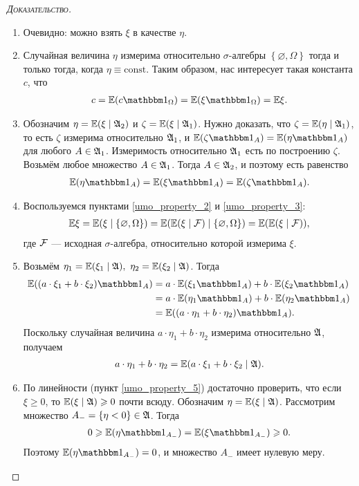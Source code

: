 \documentclass[../main.tex]{subfiles}
\begin{document}
 \begin{proof}[\normalfont\textsc{Доказательство}]\
  \begin{enumerate}
   \item Очевидно: можно взять $ \xi $ в качестве $ \eta $.
   \item Случайная величина $ \eta $ измерима относительно $ \sigma $-алгебры $ \left\{ \varnothing, \Omega \right\} $ тогда и только тогда, когда $ \eta \equiv \mathrm{const} $. Таким образом, нас интересует такая константа $ c $, что
    \begin{align*}
     c = \E(c \Ind_\Omega) = \E(\xi \Ind_\Omega) = \E\xi.
    \end{align*}
   \item Обозначим $ \eta = \mathbb E(\xi \mid \mathfrak A_2) $ и $ \zeta = \mathbb E(\xi \mid \mathfrak A_1) $. Нужно доказать, что $ \zeta = \mathbb E(\eta \mid \mathfrak A_1) $, то есть $ \zeta $ измерима относительно $ \mathfrak A_1 $, и $ \E(\zeta\Ind_A) = \E(\eta\Ind_A) $ для любого $ A \in \mathfrak A_1 $. Измеримость относительно $ \mathfrak A_1 $ есть по построению $ \zeta $. Возьмём любое множество $ A \in \mathfrak A_1 $. Тогда $ A \in \mathfrak A_2 $, и поэтому есть равенство
    \begin{align*}
     \E(\eta \Ind_A) = \E(\xi\Ind_A) = \E(\zeta \Ind_A).
    \end{align*}

   \item Воспользуемся пунктами \ref{umo_property_2} и \ref{umo_property_3}:
    \begin{align*}
     \mathbb E\xi = \mathbb E(\xi \mid \{\varnothing, \Omega\}) = \mathbb E(\mathbb E(\xi \mid \mathcal F) \mid \{\varnothing, \Omega\}) = \mathbb E(\mathbb E(\xi \mid \mathcal F)),
    \end{align*} где $ \mathcal F $ --- исходная $ \sigma $-алгебра, относительно которой измерима $ \xi $.
   \item Возьмём $\eta_1 = \E(\xi_1 \mid \A), \ \eta_2 = \E(\xi_2 \mid \A)$. Тогда
    \begin{align*}
     \E((a \cdot \xi_1 + b \cdot \xi_2) \Ind_A) &= a \cdot \E(\xi_1 \Ind_A) + b \cdot \E(\xi_2 \Ind_A) \\
     &= a \cdot \E(\eta_1 \Ind_A) + b \cdot \E(\eta_2 \Ind_A) \\
     &= \E((a \cdot \eta_1 + b \cdot \eta_2) \Ind_A).
    \end{align*}
    Поскольку случайная величина $ a \cdot \eta_ 1 + b \cdot \eta_2 $ измерима относительно $ \mathfrak A $, получаем
    \begin{align*}
     a \cdot \eta_1 + b \cdot \eta_2 = \mathbb E(a \cdot \xi_1 + b \cdot \xi_2 \mid \mathfrak A).
    \end{align*}
   \item По линейности (пункт \ref{umo_property_5}) достаточно проверить, что если $ \xi \geqslant 0 $, то $ \mathbb E(\xi \mid \mathfrak A) \geqslant 0 $ почти всюду. Обозначим $ \eta = \mathbb E(\xi \mid \mathfrak A) $. Рассмотрим множество $ A_- = \left\{ \eta < 0 \right\} \in \mathfrak A $. Тогда 
    \begin{align*}
     0\geqslant \E(\eta \Ind_{A_-}) = \E(\xi\Ind_{A_-}) \geqslant 0.
    \end{align*} Поэтому $ \E(\eta \Ind_{A_-}) = 0 $, и множество $ A_- $ имеет нулевую меру.
  \end{enumerate}
 \end{proof}
\end{document}
